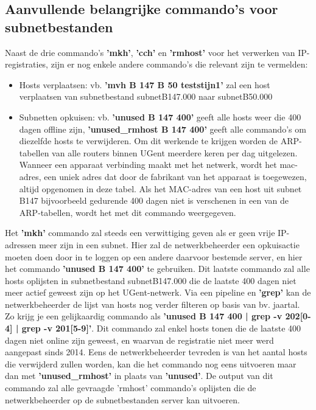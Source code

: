 \subsection{Aanvullende belangrijke commando's voor subnetbestanden}
Naast de drie commando's \textbf{'mkh'}, \textbf{'cch'} en \textbf{'rmhost'} voor het verwerken van IP-registraties, zijn er nog enkele andere commando's die relevant zijn te vermelden:

\begin{itemize}
    \item Hosts verplaatsen: vb. \textbf{'mvh B 147 B 50 teststijn1'} zal een host verplaatsen van subnetbestand subnetB147.000 naar subnetB50.000 
    \item Subnetten opkuisen: vb. \textbf{'unused B 147 400'} geeft alle hosts weer die 400 dagen offline zijn, \textbf{'unused\_rmhost B 147 400'} geeft alle commando's om diezelfde hosts te verwijderen. Om dit werkende te krijgen worden de \acrshort{ARP}-tabellen van alle routers binnen UGent meerdere keren per dag uitgelezen. Wanneer een apparaat verbinding maakt met het netwerk, wordt het \acrfull{mac}-adres, een uniek adres dat door de fabrikant van het apparaat is toegewezen, altijd opgenomen in deze tabel. Als het MAC-adres van een host uit subnet B147 bijvoorbeeld gedurende 400 dagen niet is verschenen in een van de ARP-tabellen, wordt het met dit commando weergegeven.
\end{itemize}


Het \textbf{'mkh'} commando zal steeds een verwittiging geven als er geen vrije IP-adressen meer zijn in een subnet. Hier zal de netwerkbeheerder een opkuisactie moeten doen door in te loggen op een andere daarvoor bestemde server, en hier het commando \textbf{'unused B 147 400'} te gebruiken. Dit laatste commando zal alle hosts oplijsten in subnetbestand subnetB147.000 die de laatste 400 dagen niet meer actief geweest zijn op het UGent-netwerk. Via een pipeline en \textbf{'grep'} kan de netwerkbeheerder de lijst van hosts nog verder filteren op basis van bv. jaartal. Zo krijg je een gelijkaardig commando als \textbf{'unused B 147 400 | grep -v 202[0-4] | grep -v 201[5-9]'}. 
Dit commando zal enkel hosts tonen die de laatste 400 dagen niet online zijn geweest, en waarvan de registratie niet meer werd aangepast sinds 2014. Eens de netwerkbeheerder tevreden is van het aantal hosts die verwijderd zullen worden, kan die het commando nog eens uitvoeren maar dan met \textbf{'unused\_rmhost'} in plaats van \textbf{'unused'}. De output van dit commando zal alle gevraagde 'rmhost' commando's oplijsten die de netwerkbeheerder op de subnetbestanden server kan uitvoeren.

